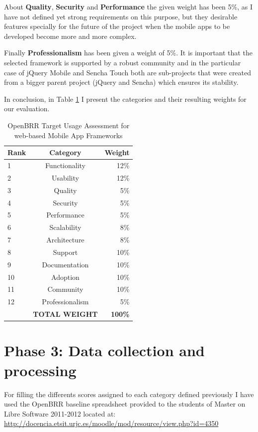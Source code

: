 \documentclass[a4paper,12pt]{book}
\begin{document}
About \textbf{Quality}, \textbf{Security} and \textbf{Performance} the given weight has been 5\%, as I have not defined yet strong requirements on this purpose, but they desirable features specially for the future of the project when the mobile apps to be developed become more and more complex.

Finally \textbf{Professionalism} has been given a weight of 5\%. It is important that the selected framework is supported by a robust community and in the particular case of jQuery Mobile and Sencha Touch both are sub-projects that were created from a bigger parent project (jQuery and Sencha) which ensures its stability. 

In conclusion, in Table \ref{OpenBRR2} I present the categories and
their resulting weights for our evaluation.

\begin{table}[ht]
\begin{center}
    \begin{tabular}{ | l | c | r |}
    \hline
    \textbf{Rank} & \textbf{Category} & \textbf{Weight} \\ \hline
    1 & Functionality & 12\% \\ \hline
    2 & Usability & 12\% \\ \hline
    3 & Quality & 5\% \\ \hline
    4 & Security & 5\% \\ \hline
    5 & Performance & 5\% \\ \hline
    6 & Scalability & 8\% \\ \hline
    7 & Architecture & 8\% \\ \hline
    8 & Support & 10\% \\ \hline
    9 & Documentation & 10\% \\ \hline
    10 & Adoption & 10\% \\ \hline
    11 & Community & 10\% \\ \hline
    12 & Professionalism & 5\% \\ \hline
     & \textbf{TOTAL WEIGHT} & \textbf{100\%} \\ \hline  
    \end{tabular}
\end{center}
 \caption{OpenBRR Target Usage Assessment for web-based Mobile App Frameworks}
\label{OpenBRR2}
\end{table}

\section{Phase 3: Data collection and processing}
\label{sec:phase3}
For filling the differents scores assigned to each category defined previously I have used the OpenBRR baseline spreadsheet provided to the students of Master on Libre Software 2011-2012 located at:\\
\url{http://docencia.etsit.urjc.es/moodle/mod/resource/view.php?id=4350}
\end{document}
